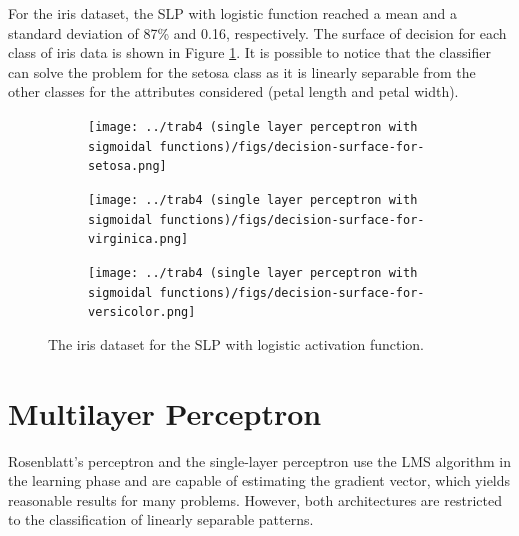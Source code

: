 \documentclass[12pt,a4paper]{article}
\begin{document}
For the iris dataset, the SLP with logistic function reached a mean and a standard deviation of 87\% and 0.16, respectively.  The surface of decision for each class of iris data is shown in Figure \ref{fig:iris-decision-surface}. It is possible to notice that the classifier can solve the problem for the setosa class as it is linearly separable from the other classes for the attributes considered (petal length and petal width).

\begin{figure}[H]
    \centering
    \begin{subfigure}{0.6\textwidth}
        \texttt{[image: ../trab4 (single layer perceptron with sigmoidal functions)/figs/decision-surface-for-setosa.png]}
    \end{subfigure}
\end{figure}    
\begin{figure}[H]\ContinuedFloat
    \centering
    \begin{subfigure}{0.6\textwidth}
        \texttt{[image: ../trab4 (single layer perceptron with sigmoidal functions)/figs/decision-surface-for-virginica.png]}
    \end{subfigure}
\end{figure}
\begin{figure}[H]\ContinuedFloat
    \centering
    \begin{subfigure}{0.6\textwidth}
        \texttt{[image: ../trab4 (single layer perceptron with sigmoidal functions)/figs/decision-surface-for-versicolor.png]}
    \end{subfigure}
    \caption{The iris dataset for the SLP with logistic activation function.}
    \label{fig:iris-decision-surface}
\end{figure}

\section{Multilayer Perceptron}

Rosenblatt's perceptron and the single-layer perceptron use the LMS algorithm in the learning phase and are capable of estimating the gradient vector, which yields reasonable results for many problems. However, both architectures are restricted to the classification of linearly separable patterns.
\end{document}
